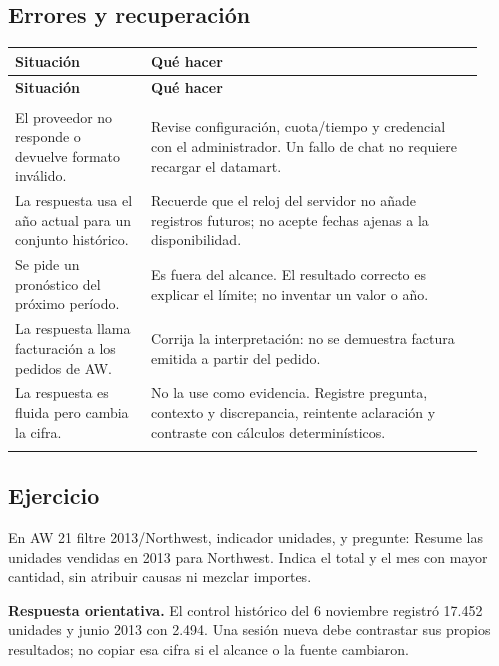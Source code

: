 \subsection{Errores y recuperación}
\begingroup
\fontsize{10}{12.5}\selectfont
\setlength{\tabcolsep}{5pt}
\renewcommand{\arraystretch}{1.15}
\begin{longtable}{@{}>{\RaggedRight\arraybackslash}p{0.27\linewidth}>{\RaggedRight\arraybackslash}p{0.66\linewidth}@{}}
\toprule
\textbf{Situación} & \textbf{Qué hacer} \\
\midrule
\endfirsthead
\toprule
\textbf{Situación} & \textbf{Qué hacer} \\
\midrule
\endhead
\midrule
\multicolumn{2}{r}{\footnotesize Continúa en la página siguiente}\\
\endfoot
\bottomrule
\endlastfoot
El proveedor no responde o devuelve formato inválido. & Revise configuración, cuota/tiempo y credencial con el administrador. Un fallo de chat no requiere recargar el datamart. \\
\addlinespace[3pt]
La respuesta usa el año actual para un conjunto histórico. & Recuerde que el reloj del servidor no añade registros futuros; no acepte fechas ajenas a la disponibilidad. \\
\addlinespace[3pt]
Se pide un pronóstico del próximo período. & Es fuera del alcance. El resultado correcto es explicar el límite; no inventar un valor o año. \\
\addlinespace[3pt]
La respuesta llama facturación a los pedidos de AW. & Corrija la interpretación: no se demuestra factura emitida a partir del pedido. \\
\addlinespace[3pt]
La respuesta es fluida pero cambia la cifra. & No la use como evidencia. Registre pregunta, contexto y discrepancia, reintente aclaración y contraste con cálculos determinísticos. \\
\addlinespace[3pt]
\end{longtable}
\endgroup

\subsection{Ejercicio}
En AW 21 filtre 2013/Northwest, indicador unidades, y pregunte: Resume las unidades vendidas en 2013 para Northwest. Indica el total y el mes con mayor cantidad, sin atribuir causas ni mezclar importes.

\textbf{Respuesta orientativa.} El control histórico del 6 noviembre registró 17.452 unidades y junio 2013 con 2.494. Una sesión nueva debe contrastar sus propios resultados; no copiar esa cifra si el alcance o la fuente cambiaron.

